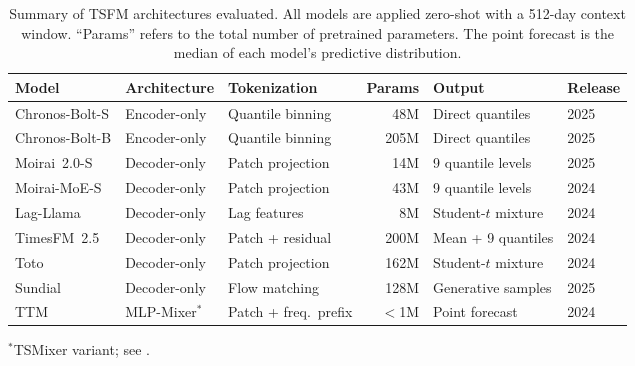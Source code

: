 \documentclass[12pt]{article}
\begin{document}
\begin{table}[H]
\centering
\singlespacing
\caption{Summary of TSFM architectures evaluated. All models are applied zero-shot with a 512-day context window. ``Params'' refers to the total number of pretrained parameters. The point forecast is the median of each model's predictive distribution.}
\label{tab:tsfm_summary}
\small
\begin{tabular}{lllrll}
\toprule
Model & Architecture & Tokenization & Params & Output & Release \\
\midrule
Chronos-Bolt-S & Encoder-only & Quantile binning & 48M & Direct quantiles & 2025 \\
Chronos-Bolt-B & Encoder-only & Quantile binning & 205M & Direct quantiles & 2025 \\
Moirai~2.0-S & Decoder-only & Patch projection & 14M & 9 quantile levels & 2025 \\
Moirai-MoE-S & Decoder-only & Patch projection & 43M & 9 quantile levels & 2024 \\
Lag-Llama & Decoder-only & Lag features & 8M & Student-$t$ mixture & 2024 \\
TimesFM~2.5 & Decoder-only & Patch + residual & 200M & Mean + 9 quantiles & 2024 \\
Toto & Decoder-only & Patch projection & 162M & Student-$t$ mixture & 2024 \\
Sundial & Decoder-only & Flow matching & 128M & Generative samples & 2025 \\
TTM & MLP-Mixer$^{*}$ & Patch + freq.\ prefix & $<$1M & Point forecast & 2024 \\
\bottomrule
\end{tabular}

\smallskip
{\footnotesize $^{*}$TSMixer variant; see \citet{ekambaram2024ttm}.}
\end{table}
\end{document}
